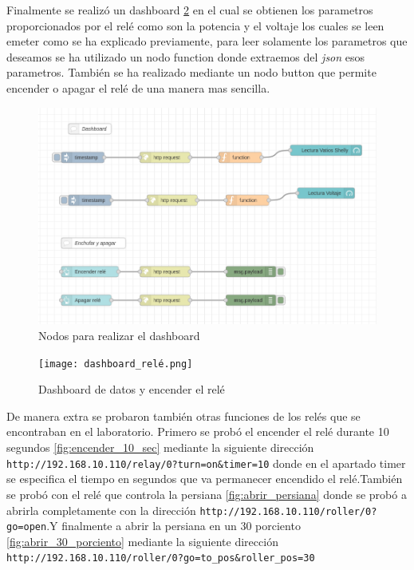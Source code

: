 \documentclass[11pt, letterpaper]{article}
\begin{document}
Finalmente se realizó un dashboard \ref{fig:dashboard_rele} en el cual se obtienen los parametros proporcionados por el relé como son la potencia y el voltaje 
los cuales se leen emeter como se ha explicado previamente, para leer solamente los parametros que deseamos se ha utilizado un nodo function 
donde extraemos del \textit{json} esos parametros. También se ha realizado mediante un nodo button que permite encender o apagar el relé de una manera mas sencilla.
\pagebreak
\begin{figure}[h]
	\centering
	\includegraphics[width=\textwidth]{dashboard_nodos.png}
	\caption{Nodos para realizar el dashboard} 
	\label{fig:Nodos_dashboard}
\end{figure}

\begin{figure}[h]
	\centering
	\texttt{[image: dashboard\_relé.png]}
	\caption{Dashboard de datos y encender el relé} 
	\label{fig:dashboard_rele}
\end{figure}
\pagebreak
De manera extra se probaron también otras funciones de los relés que se encontraban
en el laboratorio. Primero se probó el encender el relé durante 10 segundos \ref{fig:encender_10_sec} mediante la siguiente dirección 
\\\texttt{http://192.168.10.110/relay/0?turn=on\&timer=10} donde en el apartado timer se especifica el tiempo en segundos
que va permanecer encendido el relé.También se probó con el relé que controla la persiana \ref{fig:abrir_persiana} donde se probó a abrirla completamente con
la dirección \texttt{http://192.168.10.110/roller/0?go=open}.Y finalmente a abrir la persiana en un 30 porciento \ref{fig:abrir_30_porciento} mediante la siguiente dirección 
\texttt{http://192.168.10.110/roller/0?go=to\_pos\&roller\_pos=30} 
\end{document}
